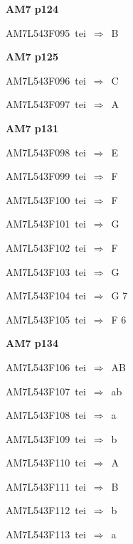 \par\vfill\eject
{\bf\hfill AM7 p124\hfill\hbox{}}\par\bigskip
{\sixrm AM7L543F095\ {\sixit tei}\ }$\Rightarrow$\ B\par\smallskip

\par\vfill\eject
{\bf\hfill AM7 p125\hfill\hbox{}}\par\bigskip
{\sixrm AM7L543F096\ {\sixit tei}\ }$\Rightarrow$\ C\par\smallskip
{\sixrm AM7L543F097\ {\sixit tei}\ }$\Rightarrow$\ A\par\smallskip

\par\vfill\eject
{\bf\hfill AM7 p131\hfill\hbox{}}\par\bigskip
{\sixrm AM7L543F098\ {\sixit tei}\ }$\Rightarrow$\ E\par\smallskip
{\sixrm AM7L543F099\ {\sixit tei}\ }$\Rightarrow$\ F\par\smallskip
{\sixrm AM7L543F100\ {\sixit tei}\ }$\Rightarrow$\ F\par\smallskip
{\sixrm AM7L543F101\ {\sixit tei}\ }$\Rightarrow$\ G\par\smallskip
{\sixrm AM7L543F102\ {\sixit tei}\ }$\Rightarrow$\ F\par\smallskip
{\sixrm AM7L543F103\ {\sixit tei}\ }$\Rightarrow$\ G\par\smallskip
{\sixrm AM7L543F104\ {\sixit tei}\ }$\Rightarrow$\ G 7\par\smallskip
{\sixrm AM7L543F105\ {\sixit tei}\ }$\Rightarrow$\ F 6\par\smallskip

\par\vfill\eject
{\bf\hfill AM7 p134\hfill\hbox{}}\par\bigskip
{\sixrm AM7L543F106\ {\sixit tei}\ }$\Rightarrow$\ AB\par\smallskip
{\sixrm AM7L543F107\ {\sixit tei}\ }$\Rightarrow$\ {\tenit ab}\par\smallskip
{\sixrm AM7L543F108\ {\sixit tei}\ }$\Rightarrow$\ {\tenit a}\par\smallskip
{\sixrm AM7L543F109\ {\sixit tei}\ }$\Rightarrow$\ {\tenit b}\par\smallskip
{\sixrm AM7L543F110\ {\sixit tei}\ }$\Rightarrow$\ A\par\smallskip
{\sixrm AM7L543F111\ {\sixit tei}\ }$\Rightarrow$\ B\par\smallskip
{\sixrm AM7L543F112\ {\sixit tei}\ }$\Rightarrow$\ {\tenit b}\par\smallskip
{\sixrm AM7L543F113\ {\sixit tei}\ }$\Rightarrow$\ {\tenit a}\par\smallskip

